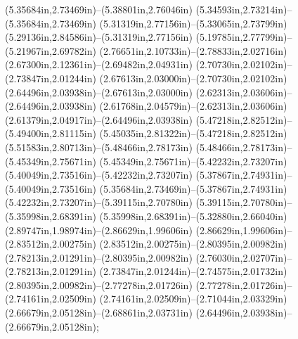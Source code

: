 (5.35684in,2.73469in)--(5.38801in,2.76046in) (5.34593in,2.73214in)--(5.35684in,2.73469in) (5.31319in,2.77156in)--(5.33065in,2.73799in) (5.29136in,2.84586in)--(5.31319in,2.77156in) (5.19785in,2.77799in)--(5.21967in,2.69782in) (2.76651in,2.10733in)--(2.78833in,2.02716in) (2.67300in,2.12361in)--(2.69482in,2.04931in) (2.70730in,2.02102in)--(2.73847in,2.01244in) (2.67613in,2.03000in)--(2.70730in,2.02102in) (2.64496in,2.03938in)--(2.67613in,2.03000in) (2.62313in,2.03606in)--(2.64496in,2.03938in) (2.61768in,2.04579in)--(2.62313in,2.03606in) (2.61379in,2.04917in)--(2.64496in,2.03938in) (5.47218in,2.82512in)--(5.49400in,2.81115in) (5.45035in,2.81322in)--(5.47218in,2.82512in) (5.51583in,2.80713in)--(5.48466in,2.78173in) (5.48466in,2.78173in)--(5.45349in,2.75671in) (5.45349in,2.75671in)--(5.42232in,2.73207in) (5.40049in,2.73516in)--(5.42232in,2.73207in) (5.37867in,2.74931in)--(5.40049in,2.73516in) (5.35684in,2.73469in)--(5.37867in,2.74931in) (5.42232in,2.73207in)--(5.39115in,2.70780in) (5.39115in,2.70780in)--(5.35998in,2.68391in) (5.35998in,2.68391in)--(5.32880in,2.66040in) (2.89747in,1.98974in)--(2.86629in,1.99606in) (2.86629in,1.99606in)--(2.83512in,2.00275in) (2.83512in,2.00275in)--(2.80395in,2.00982in) (2.78213in,2.01291in)--(2.80395in,2.00982in) (2.76030in,2.02707in)--(2.78213in,2.01291in) (2.73847in,2.01244in)--(2.74575in,2.01732in) (2.80395in,2.00982in)--(2.77278in,2.01726in) (2.77278in,2.01726in)--(2.74161in,2.02509in) (2.74161in,2.02509in)--(2.71044in,2.03329in) (2.66679in,2.05128in)--(2.68861in,2.03731in) (2.64496in,2.03938in)--(2.66679in,2.05128in);
